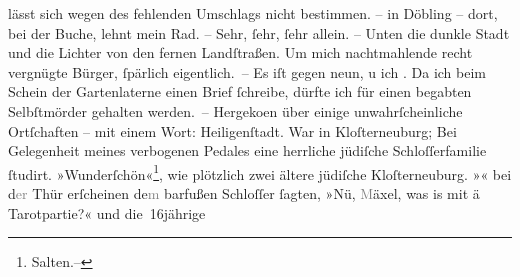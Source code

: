 \begin{ledgroupsized}[t]{13cm}
{{{                  lässt sich wegen des fehlenden Umschlags nicht bestimmen.}}}\label{K_L02960-1h} – in Döbling – dort, bei der Buche, lehnt mein Rad. –
               Sehr, ſehr, ſehr allein. – Unten die dunkle Stadt und die Lichter von den fernen Landſtraßen. Um mich
               nachtmahlende recht vergnügte Bürger, ſpärlich eigentlich. – Es iſt gegen
                  neun, u ich \label{K_L02960-2v}\label{K_L02960-2h}. Da ich beim Schein der Gartenlaterne {\pb}einen Brief ſchreibe, dürfte ich für einen
               begabten Selbſtmörder gehalten werden. – Hergeko{\geminationm}en über
               einige unwahrſcheinliche Ortſchaften – mit einem Wort: Heiligenſtadt. War in Kloſterneuburg;
               Bei Gelegenheit meines verbogenen Pedales eine herrliche jüdiſche Schloſſerfamilie
                  {\pb}ſtudirt. »Wunderſchön«\footnote{\noindent{}Salten.–}, wie plötzlich zwei ältere jüdiſche Kloſterneuburg. »\label{K_L02960-3v}\label{K_L02960-3h}« bei
                  d\textcolor{gray}{er} Thür erſcheinen {\kaufmannsund}
                  de\textcolor{gray}{m}
               barfußen Schloſſer ſagten, »Nü,
                  \textcolor{gray}{M}äxel, was is mit ä Tarotpartie?« und die 16jährige \label{K_L02960-4v}
\end{ledgroupsized}
